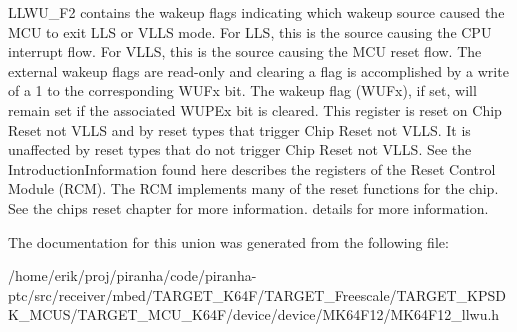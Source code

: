 L\+L\+W\+U\+\_\+\+F2 contains the wakeup flags indicating which wakeup source caused the M\+CU to exit L\+LS or V\+L\+LS mode. For L\+LS, this is the source causing the C\+PU interrupt flow. For V\+L\+LS, this is the source causing the M\+CU reset flow. The external wakeup flags are read-\/only and clearing a flag is accomplished by a write of a 1 to the corresponding W\+U\+Fx bit. The wakeup flag (W\+U\+Fx), if set, will remain set if the associated W\+U\+P\+Ex bit is cleared. This register is reset on Chip Reset not V\+L\+LS and by reset types that trigger Chip Reset not V\+L\+LS. It is unaffected by reset types that do not trigger Chip Reset not V\+L\+LS. See the Introduction\+Information found here describes the registers of the Reset Control Module (R\+CM). The R\+CM implements many of the reset functions for the chip. See the chip\textquotesingle{}s reset chapter for more information. details for more information. 

The documentation for this union was generated from the following file\+:\begin{DoxyCompactItemize}
\item 
/home/erik/proj/piranha/code/piranha-\/ptc/src/receiver/mbed/\+T\+A\+R\+G\+E\+T\+\_\+\+K64\+F/\+T\+A\+R\+G\+E\+T\+\_\+\+Freescale/\+T\+A\+R\+G\+E\+T\+\_\+\+K\+P\+S\+D\+K\+\_\+\+M\+C\+U\+S/\+T\+A\+R\+G\+E\+T\+\_\+\+M\+C\+U\+\_\+\+K64\+F/device/device/\+M\+K64\+F12/M\+K64\+F12\+\_\+llwu.\+h\end{DoxyCompactItemize}
